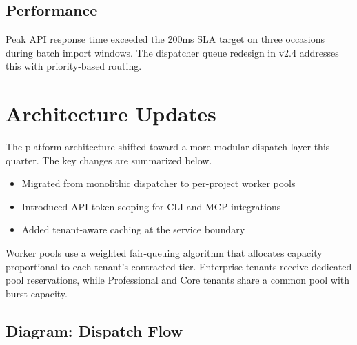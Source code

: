 \documentclass[11pt]{article}
\begin{document}
\subsection{Performance}

\begin{criticalpoint}
Peak API response time exceeded the 200ms SLA target on three occasions during batch import windows. The dispatcher queue redesign in v2.4 addresses this with priority-based routing.
\end{criticalpoint}

\section{Architecture Updates}

The platform architecture shifted toward a more modular dispatch layer this quarter. The key changes are summarized below.

\begin{itemize}
    \item Migrated from monolithic dispatcher to per-project worker pools
    \item Introduced API token scoping for CLI and MCP integrations
    \item Added tenant-aware caching at the service boundary
\end{itemize}

\begin{technicaldetail}
Worker pools use a weighted fair-queuing algorithm that allocates capacity proportional to each tenant's contracted tier. Enterprise tenants receive dedicated pool reservations, while Professional and Core tenants share a common pool with burst capacity.
\end{technicaldetail}

\subsection{Diagram: Dispatch Flow}

\begin{center}
\end{center}
\end{document}
